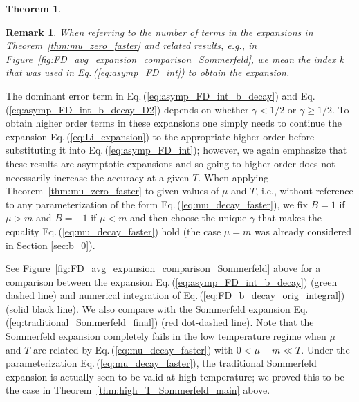 \documentclass[sn-mathphys,Numbered]{sn-jnl}
\newcommand{\req}[1]{Eq.\,(\ref{#1})}
\newcommand{\rf}[1]{Figure~{\ref{#1}}}
\newtheorem{theorem}{Theorem}
\newcommand{\rTh}[1]{Theorem~{\ref{#1}}}
\newtheorem{remark}{Remark}
\begin{document}
\begin{theorem}

\end{theorem}
\begin{remark}
 When referring to the number of terms in the expansions in \rTh{thm:mu_zero_faster} and related results, e.g., in \rf{fig:FD_avg_expansion_comparison_Sommerfeld}, we mean the index $k$ that was used in \req{eq:asymp_FD_int} to obtain the expansion.
\end{remark}
The dominant error term in \req{eq:asymp_FD_int_b_decay} and \req{eq:asymp_FD_int_b_decay_D2} depends on whether $\gamma<1/2$ or $\gamma\geq 1/2$. To obtain higher order terms in these expansions one simply needs to continue the expansion \req{eq:Li_expansion} to the appropriate higher order before substituting it into \req{eq:asymp_FD_int}; however, we again emphasize that these results are asymptotic expansions and so going to higher order does not necessarily increase the accuracy at a given $T$. When applying \rTh{thm:mu_zero_faster} to given values of $\mu$ and $T$, i.e., without reference to any parameterization of the form \req{eq:mu_decay_faster}, we fix $B=1$ if $\mu>m$ and $B=-1$ if $\mu<m$ and then choose the unique $\gamma$ that makes the equality \req{eq:mu_decay_faster} hold (the case $\mu=m$ was already considered in Section \ref{sec:b_0}). 

See \rf{fig:FD_avg_expansion_comparison_Sommerfeld} above for a comparison between the expansion \req{eq:asymp_FD_int_b_decay} (green dashed line) and numerical integration of \req{eq:FD_b_decay_orig_integral} (solid black line). We also compare with the Sommerfeld expansion \req{eq:traditional_Sommerfeld_final} (red dot-dashed line). Note that the Sommerfeld expansion completely fails in the low temperature regime when $\mu$ and $T$ are related by \req{eq:mu_decay_faster} with $0<\mu-m\ll T$. Under the parameterization \req{eq:mu_decay_faster}, the traditional Sommerfeld expansion is actually seen to be valid at high temperature; we proved this to be the case in \rTh{thm:high_T_Sommerfeld_main} above. 
\end{document}
